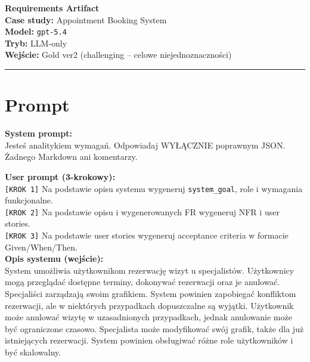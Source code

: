 \documentclass[12pt,a4paper]{article}
\begin{document}
\begin{center}
  {\LARGE\bfseries Requirements Artifact}\\[1.5em]
  {\large \textbf{Case study:} Appointment Booking System}\\[0.3em]
  {\large \textbf{Model:} \texttt{gpt-5.4}}\\[0.3em]
  {\large \textbf{Tryb:} LLM-only}\\[0.3em]
  {\large \textbf{Wejście:} Gold ver2 (challenging -- celowe niejednoznaczności)}
\end{center}

\vspace{1em}\hrule\vspace{1.5em}

\section{Prompt}

\begin{mdframed}[backgroundcolor=metabg, linewidth=0pt, innerleftmargin=10pt, innerrightmargin=10pt, innertopmargin=8pt, innerbottommargin=8pt]
\textbf{System prompt:}\\
\small Jesteś analitykiem wymagań. Odpowiadaj WYŁĄCZNIE poprawnym JSON. Żadnego Markdown ani komentarzy.
\end{mdframed}

\vspace{0.5em}
\begin{mdframed}[backgroundcolor=promptbg, linewidth=0pt, innerleftmargin=10pt, innerrightmargin=10pt, innertopmargin=8pt, innerbottommargin=8pt]
\textbf{User prompt (3-krokowy):}\\[0.3em]
\small
\texttt{[KROK 1]} Na podstawie opisu systemu wygeneruj \texttt{system\_goal}, role i wymagania funkcjonalne.\\
\texttt{[KROK 2]} Na podstawie opisu i wygenerowanych FR wygeneruj NFR i user stories.\\
\texttt{[KROK 3]} Na podstawie user stories wygeneruj acceptance criteria w formacie Given/When/Then.\\[0.3em]
\textbf{Opis systemu (wejście):}\\
System umożliwia użytkownikom rezerwację wizyt u specjalistów. Użytkownicy mogą przeglądać dostępne terminy, dokonywać rezerwacji oraz je anulować. Specjaliści zarządzają swoim grafikiem. System powinien zapobiegać konfliktom rezerwacji, ale w niektórych przypadkach dopuszczalne są wyjątki. Użytkownik może anulować wizytę w uzasadnionych przypadkach, jednak anulowanie może być ograniczone czasowo. Specjalista może modyfikować swój grafik, także dla już istniejących rezerwacji. System powinien obsługiwać różne role użytkowników i być skalowalny.
\end{mdframed}
\end{document}

